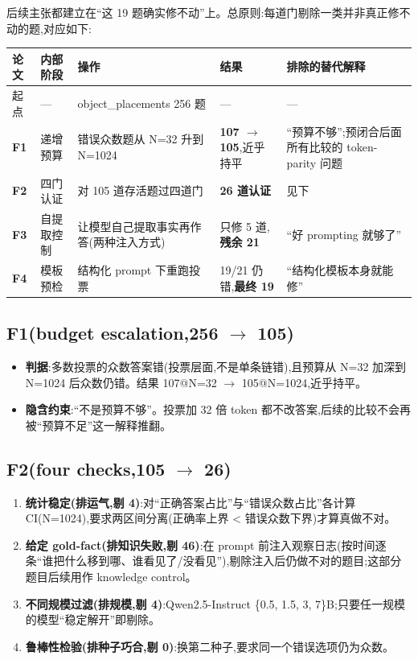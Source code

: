 \documentclass[fontset=none,10.5pt]{ctexart}
\begin{document}
后续主张都建立在``这 19 题确实修不动''上。总原则:每道门剔除一类并非真正修不动的题,对应如下:

\begin{center}\small
\begin{tabular}{@{}llp{11.5em}lp{13em}@{}}
\toprule
\rowcolor{tabhead}论文 & 内部阶段 & 操作 & 结果 & 排除的替代解释 \\
\midrule
起点 & — & object\_placements 256 题 & — & — \\
\textbf{F1} & 递增预算 & 错误众数题从 N=32 升到 N=1024 & \textbf{107 $\to$ 105},近乎持平 & ``预算不够'';预闭合后面所有比较的 token-parity 问题 \\
\textbf{F2} & 四门认证 & 对 105 道存活题过四道门 & \textbf{26 道认证} & 见下 \\
\textbf{F3} & 自提取控制 & 让模型自己提取事实再作答(两种注入方式) & 只修 5 道,\textbf{残余 21} & ``好 prompting 就够了'' \\
\textbf{F4} & 模板预检 & 结构化 prompt 下重跑投票 & 19/21 仍错,\textbf{最终 19} & ``结构化模板本身就能修'' \\
\bottomrule
\end{tabular}
\end{center}

\subsection{F1(budget escalation,256 $\to$ 105)}

\begin{itemize}
\item \textbf{判据}:多数投票的众数答案错(投票层面,不是单条链错),且预算从 N=32 加深到 N=1024 后众数仍错。结果 107@N=32 $\to$ 105@N=1024,近乎持平。
\item \textbf{隐含约束}:``不是预算不够''。投票加 32 倍 token 都不改答案,后续的比较不会再被``预算不足''这一解释推翻。
\end{itemize}

\subsection{F2(four checks,105 $\to$ 26)}

\begin{enumerate}
\item \textbf{统计稳定(排运气,剔 4)}:对``正确答案占比''与``错误众数占比''各计算 CI(N=1024),要求两区间分离(正确率上界 < 错误众数下界)才算真做不对。
\item \textbf{给定 gold-fact(排知识失败,剔 46)}:在 prompt 前注入观察日志(按时间逐条``谁把什么移到哪、谁看见了/没看见''),剔除注入后仍做不对的题目;这部分题目后续用作 knowledge control。
\item \textbf{不同规模过滤(排规模,剔 4)}:Qwen2.5-Instruct \{0.5, 1.5, 3, 7\}B;只要任一规模的模型``稳定解开''即剔除。
\item \textbf{鲁棒性检验(排种子巧合,剔 0)}:换第二种子,要求同一个错误选项仍为众数。
\end{enumerate}
\end{document}

